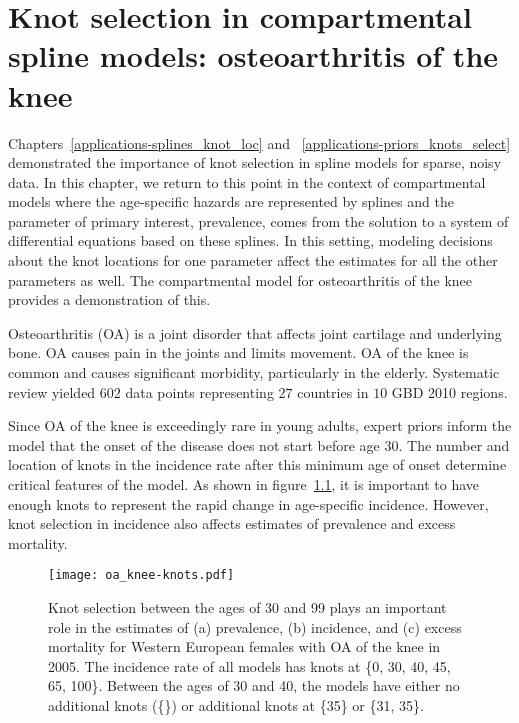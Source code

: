 \chapter{Knot selection in compartmental spline models: osteoarthritis of the knee}
\label{applications-con_fit_splines}

Chapters~\ref{applications-splines_knot_loc} and
~\ref{applications-priors_knots_select} demonstrated the importance of
knot selection in spline models for sparse, noisy data. In this
chapter, we return to this point in the context of compartmental
models where the age-specific hazards are represented by splines and
the parameter of primary interest, prevalence, comes from the solution
to a system of differential equations based on these splines. In this
setting, modeling decisions about the knot locations for one parameter
affect the estimates for all the other parameters as well.  The
compartmental model for osteoarthritis of the knee provides a
demonstration of this.

Osteoarthritis (OA) is a joint disorder that affects joint cartilage and
underlying bone.  OA causes pain in the joints and limits movement.
OA of the knee is common and causes significant
morbidity, particularly in the
elderly. \cite{felson_epidemiology_1988, felson_incidence_1995}
Systematic review yielded $602$ data points representing $27$ countries
in $10$ GBD 2010 regions.

Since OA of the knee is exceedingly rare in young adults, expert priors inform the
model that the onset of the disease does not start before age 30.  The
number and location of knots in the incidence rate after this minimum
age of onset determine critical features of the model. As shown in
figure~\ref{fig:app-oa knee knots}, it is important to have enough
knots to represent the rapid change in age-specific incidence.
However, knot selection in incidence also affects estimates of
prevalence and excess mortality.

    \begin{figure}[h]
        \begin{center}
            \texttt{[image: oa\_knee-knots.pdf]}
            \caption[Comparison of osteoarthritis of the knee estimates
              using a compartmental model with different knot selections.]{Knot
              selection between the ages of 30 and 99
              plays an important role in the estimates of
              (a) prevalence, (b) incidence, and
              (c) excess mortality
              for Western European females
              with OA of the knee in 2005.  The
              incidence rate of all models has knots at \{0, 30,
              40, 45, 65, 100\}.  Between the ages
              of 30 and 40, the models have either no additional knots (\{\}) or additional knots at \{35\}
              or \{31, 35\}.}
            \label{fig:app-oa knee knots}
        \end{center}
    \end{figure}

